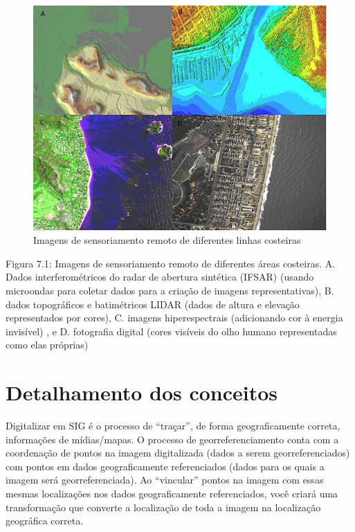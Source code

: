\documentclass[
]{book}
\begin{document}
\begin{figure}
\centering
\includegraphics{media/modulo7/rs-images.png}
\caption{Imagens de sensoriamento remoto de diferentes linhas costeiras}
\end{figure}

Figura 7.1: Imagens de sensoriamento remoto de diferentes áreas costeiras. A. Dados interferométricos do radar de abertura sintética (IFSAR) (usando microondas para coletar dados para a criação de imagens representativas), B. dados topográficos e batimétricos LIDAR (dados de altura e elevação representados por cores), C. imagens hiperespectrais (adicionando cor à energia invisível) , e D. fotografia digital (cores visíveis do olho humano representadas como elas próprias)

\hypertarget{detalhamento-dos-conceitos-4}{%
\section{Detalhamento dos conceitos}\label{detalhamento-dos-conceitos-4}}

Digitalizar em SIG é o processo de ``traçar'', de forma geograficamente correta, informações de mídias/mapas. O processo de georreferenciamento conta com a coordenação de pontos na imagem digitalizada (dados a serem georreferenciados) com pontos em dados geograficamente referenciados (dados para os quais a imagem será georreferenciada). Ao ``vincular'' pontos na imagem com essas mesmas localizações nos dados geograficamente referenciados, você criará uma transformação que converte a localização de toda a imagem na localização geográfica correta.
\end{document}
